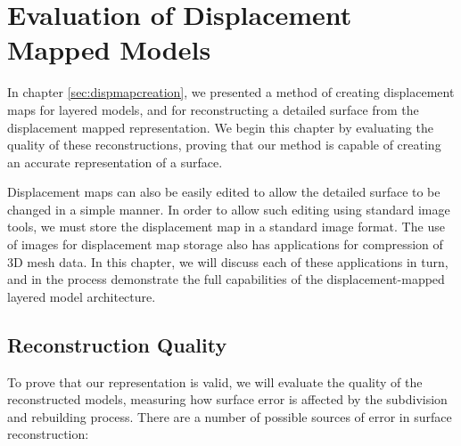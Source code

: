 \chapter{\label{sec:dispmapanim} Evaluation of Displacement Mapped Models}

In chapter \ref{sec:dispmapcreation}, we presented a method of creating displacement maps for layered models, and for reconstructing a detailed surface from the displacement mapped representation. We begin this chapter by evaluating the quality of these reconstructions, proving that our method is capable of creating an accurate representation of a surface.

Displacement maps can also be easily edited to allow the detailed surface to be changed in a simple manner. In order to allow such editing using standard image tools, we must store the displacement map in a standard image format. The use of images for displacement map storage also has applications for compression of 3D mesh data. In this chapter, we will discuss each of these applications in turn, and in the process demonstrate the full capabilities of the displacement-mapped layered model architecture.

\section{\label{sec:dispmapanim:reconstructionresults}Reconstruction Quality}

To prove that our representation is valid, we will evaluate the quality of the reconstructed models, measuring how surface error is affected by the subdivision and rebuilding process. There are a number of possible sources of error in surface reconstruction:


